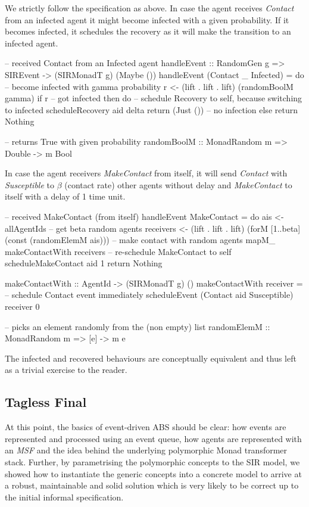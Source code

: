 We strictly follow the specification as above. In case the agent receives \textit{Contact} from an infected agent it might become infected with a given probability. If it becomes infected, it schedules the recovery as it will make the transition to an infected agent.

\begin{HaskellCode}
-- received Contact from an Infected agent
handleEvent :: RandomGen g => SIREvent -> (SIRMonadT g) (Maybe ())
handleEvent (Contact _ Infected) = do
  -- become infected with gamma probability
  r <- (lift . lift . lift) (randomBoolM gamma)
  if r
    -- got infected 
    then do
      -- schedule Recovery to self, because switching to infected
      scheduleRecovery aid delta
      return (Just ())
    -- no infection
    else return Nothing

-- returns True with given probability
randomBoolM :: MonadRandom m => Double -> m Bool
\end{HaskellCode}

In case the agent receivers \textit{MakeContact} from itself, it will send \textit{Contact} with \textit{Susceptible} to $\beta$ (contact rate) other agents without delay and \textit{MakeContact} to itself with a delay of 1 time unit.

\begin{HaskellCode}
-- received MakeContact (from itself)
handleEvent MakeContact = do
  ais <- allAgentIds
  -- get beta random agents
  receivers <- (lift . lift . lift) (forM [1..beta] (const (randomElemM ais)))
  -- make contact with random agents
  mapM_ makeContactWith receivers
  -- re-schedule MakeContact to self
  scheduleMakeContact aid 1
  return Nothing
  
makeContactWith :: AgentId -> (SIRMonadT g) ()
makeContactWith receiver = 
  -- schedule Contact event immediately
  scheduleEvent (Contact aid Susceptible) receiver 0

-- picks an element randomly from the (non empty) list
randomElemM :: MonadRandom m => [e] -> m e
\end{HaskellCode}

The infected and recovered behaviours are conceptually equivalent and thus left as a trivial exercise to the reader. 

\subsection{Tagless Final}
\label{sec:tagless_final}
At this point, the basics of event-driven ABS should be clear: how events are represented and processed using an event queue, how agents are represented with an \textit{MSF} and the idea behind the underlying polymorphic Monad transformer stack. Further, by parametrising the polymorphic concepts to the SIR model, we showed how to instantiate the generic concepts into a concrete model to arrive at a robust, maintainable and solid solution which is very likely to be correct up to the initial informal specification.

